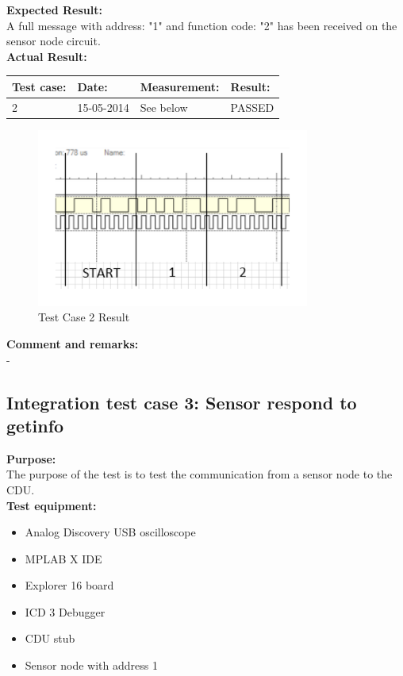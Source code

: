 \textbf{Expected Result:}\\
A full message with address: "1" and function code: "2" has been received on the sensor node circuit.\\

\textbf{Actual Result:}\\
\begin{table}[H]
\centering
\begin{tabular}{|p{2cm}|p{2cm}|p{3cm}|p{2cm}|}\hline
\textbf{Test case:} & \textbf{Date:} & \textbf{Measurement:} & \textbf{Result:} \\ \hline
2 & 15-05-2014 & See below & PASSED \\ \hline
\end{tabular}
\end{table}

\begin{figure}[H]
\centering
\includegraphics[width=0.8\textwidth]{billeder/intetestcase2}
\caption{Test Case 2 Result}
\label{fig:InteTestCase2}
\end{figure}

\textbf{Comment and remarks:}\\
-\\

\subsection{Integration test case 3: Sensor respond to getinfo}
\textbf{Purpose:}\\
The purpose of the test is to test the communication from a sensor node to the CDU.\\

\textbf{Test equipment:}
\begin{itemize}
\item Analog Discovery USB oscilloscope
\item MPLAB X IDE
\item Explorer 16 board
\item ICD 3 Debugger
\item CDU stub
\item Sensor node with address 1
\end{itemize}


